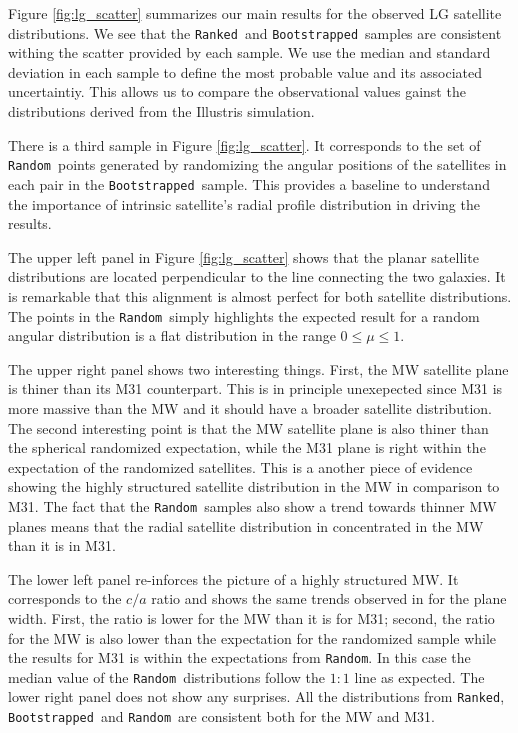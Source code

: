 \documentclass[a4paper,fleqn,usenatbib]{mnras}
\newcommand{\rank}{\texttt{Ranked}}
\newcommand{\boot}{\texttt{Bootstrapped}}
\newcommand{\rand}{\texttt{Random}}
\begin{document}
Figure \ref{fig:lg_scatter} summarizes our main results for the
observed LG satellite distributions.
We see that the \rank\ and \boot\ samples are consistent 
withing the scatter provided by each sample.
We use the median and standard deviation in each sample to define the
most probable value and its associated uncertaintiy.
This allows us to compare the observational values gainst the
distributions derived from the Illustris simulation.

There is a third sample in Figure \ref{fig:lg_scatter}. 
It corresponds to the set of \rand\ points generated
by randomizing the angular positions of the satellites in each pair in
the \boot\ sample. 
This provides a baseline to understand the importance 
of intrinsic satellite's radial profile distribution in driving the
results.   

The upper left panel in Figure \ref{fig:lg_scatter} shows that the
planar satellite distributions are located perpendicular to the line
connecting the two galaxies. 
It is remarkable that this alignment is almost perfect for both
satellite distributions. 
The points in the \rand\ simply highlights the expected result for a
random angular distribution is a flat distribution in the range
$0\leq\mu\leq 1$.

The upper right panel shows two interesting things. 
First, the MW satellite plane is thiner than its M31
counterpart. 
This is in principle unexepected since M31 is more
massive than the MW and it should have a broader satellite
distribution. 
The second interesting point is that the MW satellite plane is also
thiner than the spherical randomized expectation, while the M31 plane
is right within the expectation of the randomized satellites. 
This is a another piece of evidence showing the highly structured
satellite distribution in the MW in comparison to M31. 
The fact that the \rand\ samples also show a trend towards thinner MW
planes means that the radial satellite distribution in concentrated in
the MW than it is in M31.

The lower left panel re-inforces the picture of a highly structured
MW. 
It corresponds to the $c/a$ ratio and shows the same trends observed
in for the plane width. 
First, the ratio is lower for the MW than it is for M31; second, the
ratio for the MW is also lower than the expectation for the randomized
sample while the results for M31 is within the expectations from \rand.  
In this case the median value of the \rand\ distributions follow the
$1:1$ line as expected.
The lower right panel does not show any surprises. 
All the distributions from \rank, \boot\ and \rand\ are consistent
both for the MW and M31. 
\end{document}
